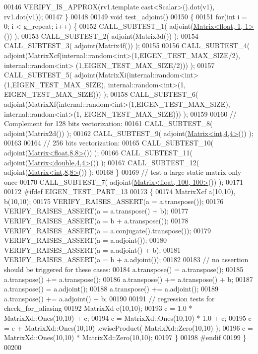 \begin{DoxyCode}
00146   VERIFY\_IS\_APPROX(rv1.template cast<Scalar>().dot(v1), rv1.dot(v1));
00147 \}
00148 
00149 \textcolor{keywordtype}{void} test\_adjoint()
00150 \{
00151   \textcolor{keywordflow}{for}(\textcolor{keywordtype}{int} i = 0; i < g\_repeat; i++) \{
00152     CALL\_SUBTEST\_1( adjoint(\hyperlink{group___core___module_class_eigen_1_1_matrix}{Matrix<float, 1, 1>}()) );
00153     CALL\_SUBTEST\_2( adjoint(Matrix3d()) );
00154     CALL\_SUBTEST\_3( adjoint(Matrix4f()) );
00155     
00156     CALL\_SUBTEST\_4( adjoint(MatrixXcf(internal::random<int>(1,EIGEN\_TEST\_MAX\_SIZE/2), internal::random<int>
      (1,EIGEN\_TEST\_MAX\_SIZE/2))) );
00157     CALL\_SUBTEST\_5( adjoint(MatrixXi(internal::random<int>(1,EIGEN\_TEST\_MAX\_SIZE), internal::random<int>(1,
      EIGEN\_TEST\_MAX\_SIZE))) );
00158     CALL\_SUBTEST\_6( adjoint(MatrixXf(internal::random<int>(1,EIGEN\_TEST\_MAX\_SIZE), internal::random<int>(1,
      EIGEN\_TEST\_MAX\_SIZE))) );
00159     
00160     \textcolor{comment}{// Complement for 128 bits vectorization:}
00161     CALL\_SUBTEST\_8( adjoint(Matrix2d()) );
00162     CALL\_SUBTEST\_9( adjoint(\hyperlink{group___core___module_class_eigen_1_1_matrix}{Matrix<int,4,4>}()) );
00163     
00164     \textcolor{comment}{// 256 bits vectorization:}
00165     CALL\_SUBTEST\_10( adjoint(\hyperlink{group___core___module_class_eigen_1_1_matrix}{Matrix<float,8,8>}()) );
00166     CALL\_SUBTEST\_11( adjoint(\hyperlink{group___core___module_class_eigen_1_1_matrix}{Matrix<double,4,4>}()) );
00167     CALL\_SUBTEST\_12( adjoint(\hyperlink{group___core___module_class_eigen_1_1_matrix}{Matrix<int,8,8>}()) );
00168   \}
00169   \textcolor{comment}{// test a large static matrix only once}
00170   CALL\_SUBTEST\_7( adjoint(\hyperlink{group___core___module_class_eigen_1_1_matrix}{Matrix<float, 100, 100>}()) );
00171 
00172 \textcolor{preprocessor}{#ifdef EIGEN\_TEST\_PART\_13}
00173   \{
00174     MatrixXcf a(10,10), b(10,10);
00175     VERIFY\_RAISES\_ASSERT(a = a.transpose());
00176     VERIFY\_RAISES\_ASSERT(a = a.transpose() + b);
00177     VERIFY\_RAISES\_ASSERT(a = b + a.transpose());
00178     VERIFY\_RAISES\_ASSERT(a = a.conjugate().transpose());
00179     VERIFY\_RAISES\_ASSERT(a = a.adjoint());
00180     VERIFY\_RAISES\_ASSERT(a = a.adjoint() + b);
00181     VERIFY\_RAISES\_ASSERT(a = b + a.adjoint());
00182 
00183     \textcolor{comment}{// no assertion should be triggered for these cases:}
00184     a.transpose() = a.transpose();
00185     a.transpose() += a.transpose();
00186     a.transpose() += a.transpose() + b;
00187     a.transpose() = a.adjoint();
00188     a.transpose() += a.adjoint();
00189     a.transpose() += a.adjoint() + b;
00190 
00191     \textcolor{comment}{// regression tests for check\_for\_aliasing}
00192     MatrixXd c(10,10);
00193     c = 1.0 * MatrixXd::Ones(10,10) + c;
00194     c = MatrixXd::Ones(10,10) * 1.0 + c;
00195     c = c + MatrixXd::Ones(10,10) .cwiseProduct( MatrixXd::Zero(10,10) );
00196     c = MatrixXd::Ones(10,10) * MatrixXd::Zero(10,10);
00197   \}
00198 \textcolor{preprocessor}{#endif}
00199 \}
00200 
\end{DoxyCode}
